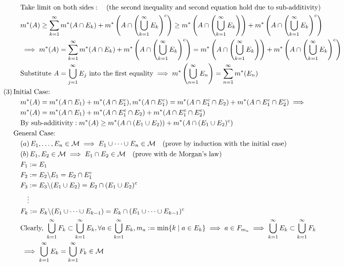 \documentclass{article}
\newcommand{\sumninf}{\displaystyle\sum_{n=1}^\infty}
\newcommand{\infcup}{\displaystyle\bigcup_{n=1}^\infty}
\newcommand{\0}{{\bf{0}}}
\newcommand{\1}{{\bf{1}}}
\begin{document}
\begin{equation}
\begin{split}
    &\quad\mbox{Take limit on both sides}:\quad(\mbox{the second inequality and second equation hold due to sub-additivity})\\
    &\quad m^*(A)\geq\sum_{k=1}^\infty m^*(A\cap E_k)+m^*\left(A\cap\left(\bigcup_{k=1}^\infty E_k\right)^c\right)\geq m^*\left(A\cap\left(\bigcup_{k=1}^\infty E_k\right)\right)+m^*\left(A\cap\left(\bigcup_{k=1}^\infty E_k\right)^c\right)\\
    &\quad\implies m^*(A)=\sum_{k=1}^\infty m^*(A\cap E_k)+m^*\left(A\cap\left(\bigcup_{k=1}^\infty E_k\right)^c\right)=m^*\left(A\cap\left(\bigcup_{k=1}^\infty E_k\right)\right)+m^*\left(A\cap\left(\bigcup_{k=1}^\infty E_k\right)^c\right)\\
    &\quad\mbox{Substitute }A=\bigcup_{j=1}^\infty E_j\mbox{ into the first equality}\implies m^*\left(\infcup E_n\right)=\sumninf m^*(E_n)\\
    (3)\,&\mbox{Initial Case:}\\
    &\quad m^*(A)=m^*(A\cap E_1)+m^*(A\cap E_1^c),m^*(A\cap E_1^c)=m^*(A\cap E_1^c\cap E_2)+m^*(A\cap E_1^c\cap E_2^c)\implies\\
    &\quad m^*(A)=m^*(A\cap E_1)+m^*(A\cap E_1^c\cap E_2)+m^*(A\cap E_1^c\cap E_2^c)\\
    &\quad\mbox{By sub-additivity}:m^*(A)\geq m^*(A\cap(E_1\cup E_2))+m^*(A\cap(E_1\cup E_2)^c)\\
    &\mbox{General Case:}\\
    &\quad(a)\,E_1,\dots,E_n\in\mathcal{M}\implies E_1\cup\dots\cup E_n\in\mathcal{M}\quad\mbox{(prove by induction with the initial case)}\\
    &\quad(b)\,E_1,E_2\in\mathcal{M}\implies E_1\cap E_2\in\mathcal{M}\quad\mbox{(prove with de Morgan's law)}\\
    &\quad F_1:=E_1\\
    &\quad F_2:=E_2\symbol{92}E_1=E_2\cap E_1^c\\
    &\quad F_3:=E_3\symbol{92}(E_1\cup E_2)=E_2\cap(E_1\cup E_2)^c\\
    &\quad\quad\vdots\\
    &\quad F_k:=E_k\symbol{92}(E_1\cup\dots\cup E_{k-1})=E_k\cap(E_1\cup\dots\cup E_{k-1})^c\\
    &\quad\mbox{Clearly, }\bigcup_{k=1}^\infty F_k\subset\bigcup_{k=1}^\infty E_k,\forall a\in\bigcup_{k=1}^\infty E_k,m_a:=\min\{k\mid a\in E_k\}\implies a\in F_{m_a}\implies \bigcup_{k=1}^\infty E_k\subset\bigcup_{k=1}^\infty F_k\\
    &\quad\implies \bigcup_{k=1}^\infty E_k=\bigcup_{k=1}^\infty F_k\in\mathcal{M}\\
\end{split}
\end{equation}
\end{document}
